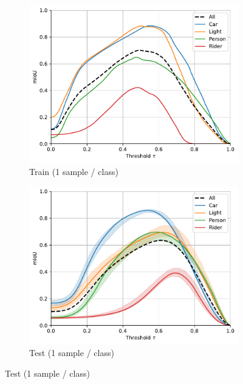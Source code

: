 \begin{figure}
\centering
  \begin{subfigure}{0.49\columnwidth}
   \includegraphics[width=\columnwidth]{img/4-experiments/heatmap-optimized-iou-1-300-train.pdf}
   \caption{Train (1 sample / class)}
   \label{fig:miou-optimized-ious-train-1}
  \end{subfigure}
  \begin{subfigure}{0.49\columnwidth}
   \includegraphics[width=\columnwidth]{img/4-experiments/heatmap-optimized-iou-1-300-test.pdf}
   \caption{Test (1 sample / class)}
   \label{fig:miou-optimized-ious-test-1}
  \end{subfigure}

\end{figure}
